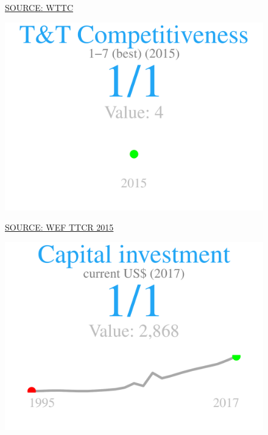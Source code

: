 \documentclass{article}\usepackage[]{graphicx}\usepackage[]{color}
\makeatletter
\def\maxwidth{ %
  \ifdim\Gin@nat@width>\linewidth
    \linewidth
  \else
    \Gin@nat@width
  \fi
}
\makeatother
\begin{document}
\begin{figure}
\begin{minipage}[t]{0.99\textwidth}
\begin{minipage}[t]{0.56\textwidth}
\begin{minipage}[c]{0.30\textwidth}
{}



    \vspace{-2ex}
    \hspace{2ex}\tiny{\href{https://tool.wttc.org/}{\textcolor[HTML]{FF4023}{SOURCE: WTTC}}}
    \end{minipage}
    \begin{minipage}[c]{0.30\textwidth}


{\centering \includegraphics[width=\maxwidth]{figure/figure_sparkline5-1} 

}



    \vspace{-2ex}
    \hspace{2ex}\tiny{\href{http://www3.weforum.org/docs/TT15/WEF_TTCR_Dataset_2015.xlsx}{\textcolor[HTML]{FF4023}{SOURCE: WEF TTCR 2015}}}
    \end{minipage}
    \begin{minipage}[c]{0.30\textwidth}


{\centering \includegraphics[width=\maxwidth]{figure/figure_sparkline6-1} 

}
\end{minipage}
\end{minipage}
\end{minipage}
\end{figure}
\end{document}
